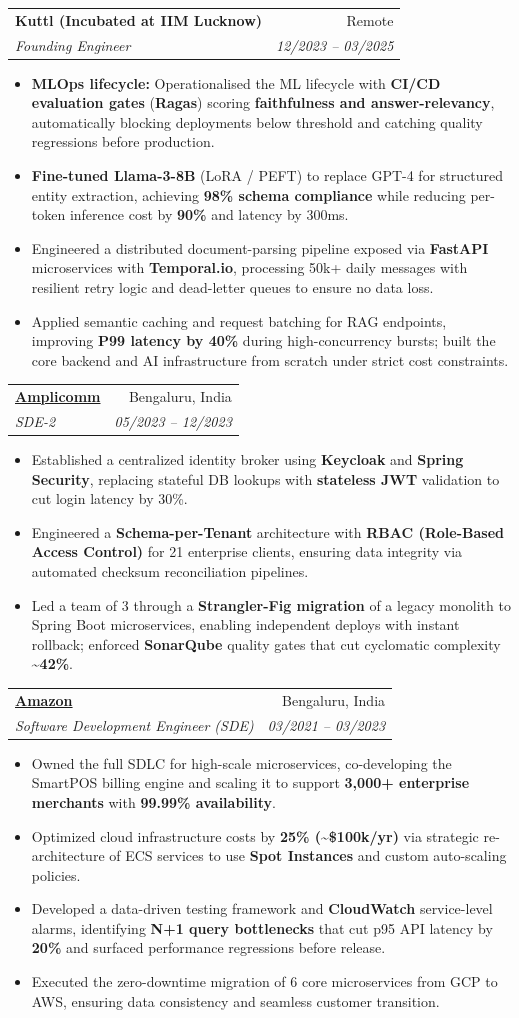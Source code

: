 \documentclass[11pt,a4paper]{article}
\makeatletter
\newcommand{\resumeItem}[1]{
  \item\small{
    {#1 \vspace{-2pt}}
  }
}
\newcommand{\resumeSubheading}[4]{
  \vspace{-1pt}\item
    \begin{tabular*}{0.97\textwidth}[t]{l@{\extracolsep{\fill}}r}
      \textbf{#1} & #2 \\
      \textit{\small#3} & \textit{\small #4} \\
    \end{tabular*}\vspace{-5pt}
}
\newcommand{\resumeItemListStart}{\begin{itemize}[itemsep=2pt, topsep=0pt, partopsep=0pt]}
\newcommand{\resumeItemListEnd}{\end{itemize}\vspace{-5pt}}
\makeatother
\begin{document}
    \resumeSubheading
      {Kuttl (Incubated at IIM Lucknow)}{Remote}
      {Founding Engineer}{12/2023 -- 03/2025}
      \resumeItemListStart
        \resumeItem{\textbf{MLOps lifecycle:} Operationalised the ML lifecycle with \textbf{CI/CD evaluation gates} (\textbf{Ragas}) scoring \textbf{faithfulness and answer-relevancy}, automatically blocking deployments below threshold and catching quality regressions before production.}
        \resumeItem{\textbf{Fine-tuned Llama-3-8B} (LoRA / PEFT) to replace GPT-4 for structured entity extraction, achieving \textbf{98\% schema compliance} while reducing per-token inference cost by \textbf{90\%} and latency by 300ms.}
        \resumeItem{Engineered a distributed document-parsing pipeline exposed via \textbf{FastAPI} microservices with \textbf{Temporal.io}, processing 50k+ daily messages with resilient retry logic and dead-letter queues to ensure no data loss.}
        \resumeItem{Applied semantic caching and request batching for RAG endpoints, improving \textbf{P99 latency by 40\%} during high-concurrency bursts; built the core backend and AI infrastructure from scratch under strict cost constraints.}
      \resumeItemListEnd

    \resumeSubheading
      {\href{https://amplicomm.com/}{Amplicomm}}{Bengaluru, India}
      {SDE-2}{05/2023 -- 12/2023}
      \resumeItemListStart
        \resumeItem{Established a centralized identity broker using \textbf{Keycloak} and \textbf{Spring Security}, replacing stateful DB lookups with \textbf{stateless JWT} validation to cut login latency by 30\%.}
        \resumeItem{Engineered a \textbf{Schema-per-Tenant} architecture with \textbf{RBAC (Role-Based Access Control)} for 21 enterprise clients, ensuring data integrity via automated checksum reconciliation pipelines.}
        \resumeItem{Led a team of 3 through a \textbf{Strangler-Fig migration} of a legacy monolith to Spring Boot microservices, enabling independent deploys with instant rollback; enforced \textbf{SonarQube} quality gates that cut cyclomatic complexity \textbf{\textasciitilde{}42\%}.}
      \resumeItemListEnd

    \resumeSubheading
      {\href{https://www.amazon.in/}{Amazon}}{Bengaluru, India}
      {Software Development Engineer (SDE)}{03/2021 -- 03/2023}
      \resumeItemListStart
        \resumeItem{Owned the full SDLC for high-scale microservices, co-developing the SmartPOS billing engine and scaling it to support \textbf{3,000+ enterprise merchants} with \textbf{99.99\% availability}.}
        \resumeItem{Optimized cloud infrastructure costs by \textbf{25\% (\textasciitilde{}\$100k/yr)} via strategic re-architecture of ECS services to use \textbf{Spot Instances} and custom auto-scaling policies.}
        \resumeItem{Developed a data-driven testing framework and \textbf{CloudWatch} service-level alarms, identifying \textbf{N+1 query bottlenecks} that cut p95 API latency by \textbf{20\%} and surfaced performance regressions before release.}
        \resumeItem{Executed the zero-downtime migration of 6 core microservices from GCP to AWS, ensuring data consistency and seamless customer transition.}
      \resumeItemListEnd
\end{document}
